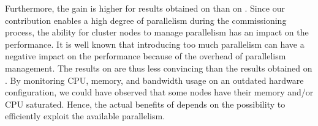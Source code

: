 Furthermore, the gain is higher for results obtained on \ecotype than on \nova.
Since our contribution enables a high degree of parallelism during the
commissioning process, the ability for cluster nodes to manage parallelism has
an impact on the performance.
%
It is well known that introducing too much parallelism can have a negative
impact on the performance because of the overhead of parallelism management.
The results on \nova are thus less convincing than the results obtained on
\ecotype.  By monitoring CPU, memory, and bandwidth usage on an outdated
hardware configuration, we could have observed that some nodes have their memory
and/or CPU saturated.
Hence, the actual benefits of \mad depends on the possibility to efficiently
exploit the available parallelism.
%
%

